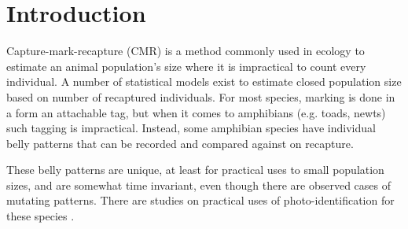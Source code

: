 \documentclass[fleqn,moreauthors,10pt]{ds_report}
\affiliation{\textsuperscript{1}\textit{ae4964@student.uni-lj.si, 63160011}}
\begin{document}
\flushbottom

\maketitle

\thispagestyle{empty}


\section*{Introduction}

Capture-mark-recapture (CMR) is a method commonly used in ecology to estimate an animal population's size where it is impractical to count every individual. A number of statistical models exist to estimate closed population size based on number of recaptured individuals. For most species, marking is done in a form an attachable tag, but when it comes to amphibians (e.g. toads, newts) such tagging is impractical. Instead, some amphibian species have individual belly patterns that can be recorded and compared against on recapture.

These belly patterns are unique, at least for practical uses to small population sizes, and are somewhat time invariant, even though there are observed cases of mutating patterns. There are studies on practical uses of photo-identification for these species \cite{genecap_ampident}.
\end{document}
